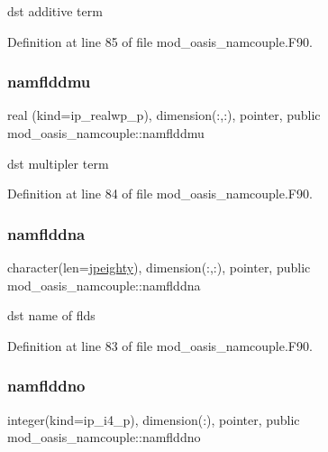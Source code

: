 dst additive term 



Definition at line 85 of file mod\+\_\+oasis\+\_\+namcouple.\+F90.

\mbox{\label{namespacemod__oasis__namcouple_adff0b79053f9cad9717a5ce3c09136e6}} 
\subsubsection{\texorpdfstring{namflddmu}{namflddmu}}
{\footnotesize\ttfamily real (kind=ip\+\_\+realwp\+\_\+p), dimension(\+:,\+:), pointer, public mod\+\_\+oasis\+\_\+namcouple\+::namflddmu}



dst multipler term 



Definition at line 84 of file mod\+\_\+oasis\+\_\+namcouple.\+F90.

\mbox{\label{namespacemod__oasis__namcouple_af064ea6bf295846a3f2f8a8b3ab66a66}} 
\subsubsection{\texorpdfstring{namflddna}{namflddna}}
{\footnotesize\ttfamily character(len=\hyperlink{namespacemod__oasis__namcouple_a4fb10ad6e864dcbe34c4a8b02204a523}{jpeighty}), dimension(\+:,\+:), pointer, public mod\+\_\+oasis\+\_\+namcouple\+::namflddna}



dst name of flds 



Definition at line 83 of file mod\+\_\+oasis\+\_\+namcouple.\+F90.

\mbox{\label{namespacemod__oasis__namcouple_a0bc8fb08bfa426cc3da584e401b45328}} 
\subsubsection{\texorpdfstring{namflddno}{namflddno}}
{\footnotesize\ttfamily integer(kind=ip\+\_\+i4\+\_\+p), dimension(\+:), pointer, public mod\+\_\+oasis\+\_\+namcouple\+::namflddno}



